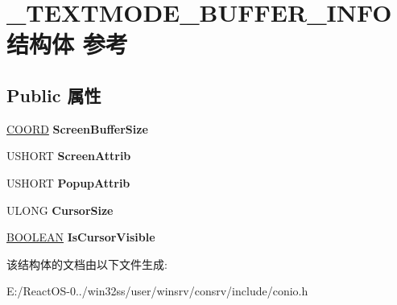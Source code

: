 \hypertarget{struct___t_e_x_t_m_o_d_e___b_u_f_f_e_r___i_n_f_o}{}\section{\+\_\+\+T\+E\+X\+T\+M\+O\+D\+E\+\_\+\+B\+U\+F\+F\+E\+R\+\_\+\+I\+N\+F\+O结构体 参考}
\label{struct___t_e_x_t_m_o_d_e___b_u_f_f_e_r___i_n_f_o}
\subsection*{Public 属性}
\begin{DoxyCompactItemize}
\item 
\mbox{\label{struct___t_e_x_t_m_o_d_e___b_u_f_f_e_r___i_n_f_o_a71d7d8b50f50d62df94b74561ca37c41}} 
\hyperlink{struct___c_o_o_r_d}{C\+O\+O\+RD} {\bfseries Screen\+Buffer\+Size}
\item 
\mbox{\label{struct___t_e_x_t_m_o_d_e___b_u_f_f_e_r___i_n_f_o_abf9d26bbded838d505b75f0594fe16a8}} 
U\+S\+H\+O\+RT {\bfseries Screen\+Attrib}
\item 
\mbox{\label{struct___t_e_x_t_m_o_d_e___b_u_f_f_e_r___i_n_f_o_a0ec074674f286b061d0fd3d01faeac5b}} 
U\+S\+H\+O\+RT {\bfseries Popup\+Attrib}
\item 
\mbox{\label{struct___t_e_x_t_m_o_d_e___b_u_f_f_e_r___i_n_f_o_adc3286385d1444a9376ab02318f80a3b}} 
U\+L\+O\+NG {\bfseries Cursor\+Size}
\item 
\mbox{\label{struct___t_e_x_t_m_o_d_e___b_u_f_f_e_r___i_n_f_o_a0170a7e94ece32095aa587824f0d8194}} 
\hyperlink{_processor_bind_8h_a112e3146cb38b6ee95e64d85842e380a}{B\+O\+O\+L\+E\+AN} {\bfseries Is\+Cursor\+Visible}
\end{DoxyCompactItemize}


该结构体的文档由以下文件生成\+:\begin{DoxyCompactItemize}
\item 
E\+:/\+React\+O\+S-\/0../win32ss/user/winsrv/consrv/include/conio.\+h\end{DoxyCompactItemize}
